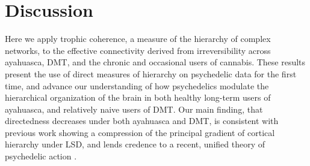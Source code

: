 \chapter{Discussion}
Here we apply trophic coherence, a measure of the hierarchy of complex networks, to the effective connectivity derived from irreversibility across ayahuasca, DMT, and the chronic and occasional users of cannabis. These results present the use of direct measures of hierarchy on psychedelic data for the first time, and advance our understanding of how psychedelics modulate the hierarchical organization of the brain in both healthy long-term users of ayahuasca, and relatively naive users of DMT. Our main finding, that directedness decreases under both ayahuasca and DMT, is consistent with previous work showing a compression of the principal gradient of cortical hierarchy under LSD, and lends credence to a recent, unified theory of psychedelic action \parencite{Girn2022, Carhart-Harris2019a}.

